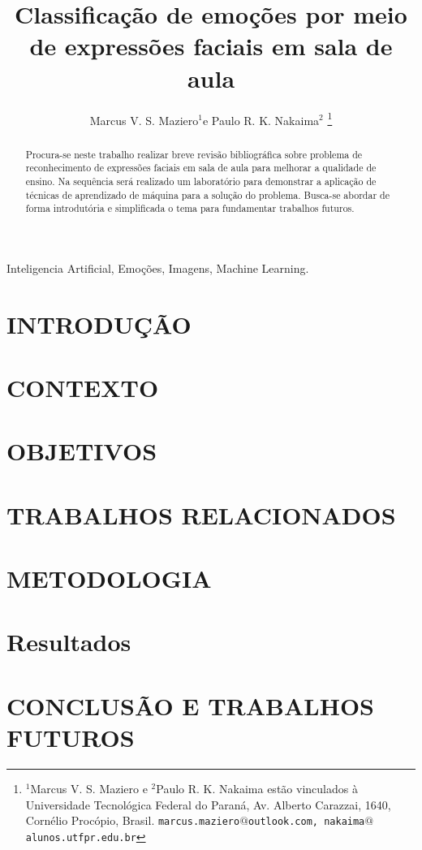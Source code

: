\documentclass[a4paper, 12 pt, conference]{ieeeconf}  %
\title{\LARGE \bf
Classificação de emoções por meio de expressões faciais em sala de aula
}
\author{Marcus V. S. Maziero$^{1}$e Paulo R. K. Nakaima$^{2}$
\thanks{$^{1}$Marcus V. S. Maziero e $^{2}$Paulo R. K. Nakaima estão vinculados à Universidade Tecnológica Federal do Paraná, Av. Alberto Carazzai, 1640, Cornélio Procópio, Brasil. 
        {\tt\small marcus.maziero$@$outlook.com, nakaima$@$alunos.utfpr.edu.br}}%
}
\begin{document}
\maketitle
\thispagestyle{empty}
\pagestyle{empty}


\begin{abstract}
Procura-se neste trabalho realizar breve revisão bibliográfica sobre problema de reconhecimento de expressões faciais em sala de aula para melhorar a qualidade de ensino. Na sequência será realizado um laboratório para demonstrar a aplicação de técnicas de aprendizado de máquina para a solução do problema. Busca-se abordar de forma introdutória e simplificada o tema para fundamentar trabalhos futuros.
\end{abstract}

\begin{keywords}
Inteligencia Artificial, Emoções, Imagens, Machine Learning.
\end{keywords}


\section{INTRODUÇÃO}


\section{CONTEXTO}


\section{OBJETIVOS}


\section{TRABALHOS RELACIONADOS}



\section{METODOLOGIA}


\section{Resultados}


\section{CONCLUSÃO E TRABALHOS FUTUROS}





\end{document}
